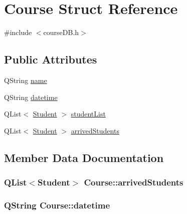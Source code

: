 \hypertarget{struct_course}{}\section{Course Struct Reference}
\label{struct_course}


{\ttfamily \#include $<$course\+D\+B.\+h$>$}

\subsection*{Public Attributes}
\begin{DoxyCompactItemize}
\item 
Q\+String \hyperlink{struct_course_a5d2a6f03014a6fe1f104a75f1eb31c4e}{name}
\item 
Q\+String \hyperlink{struct_course_a97cd76e46b20acc8c82bd7b16967c631}{datetime}
\item 
Q\+List$<$ \hyperlink{struct_student}{Student} $>$ \hyperlink{struct_course_a0f6bc505366d201dc2155eb73004c3af}{student\+List}
\item 
Q\+List$<$ \hyperlink{struct_student}{Student} $>$ \hyperlink{struct_course_ae8cb5030c622342324a20c5cf0cbbb5d}{arrived\+Students}
\end{DoxyCompactItemize}


\subsection{Member Data Documentation}
\hypertarget{struct_course_ae8cb5030c622342324a20c5cf0cbbb5d}{}
\subsubsection[{arrived\+Students}]{\setlength{\rightskip}{0pt plus 5cm}Q\+List$<${\bf Student}$>$ Course\+::arrived\+Students}\label{struct_course_ae8cb5030c622342324a20c5cf0cbbb5d}
\hypertarget{struct_course_a97cd76e46b20acc8c82bd7b16967c631}{}
\subsubsection[{datetime}]{\setlength{\rightskip}{0pt plus 5cm}Q\+String Course\+::datetime}\label{struct_course_a97cd76e46b20acc8c82bd7b16967c631}
\hypertarget{struct_course_a5d2a6f03014a6fe1f104a75f1eb31c4e}{}
